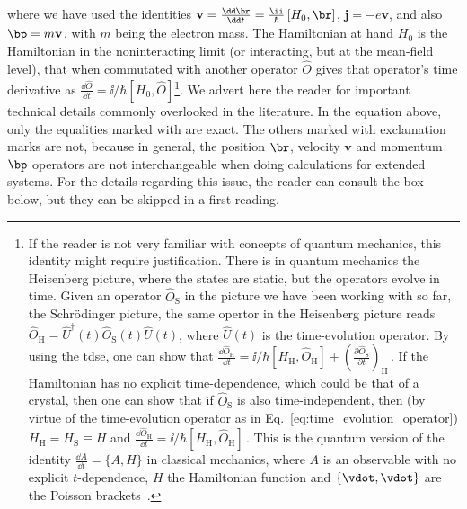 \noindent  where we have used the identities $\mathbf{v} = \frac{\dd \br}{\dd t} = \frac{\ii}{\hbar} \left[H_0,\br\right]$, $\mathbf{j}=-e\mathbf{v}$, and also $\bp = m \mathbf{v}$, with $m$ being the electron mass.
The Hamiltonian at hand $H_0$ is the Hamiltonian in the noninteracting limit (or interacting, but at the mean-field level), that when commutated with another operator $\hat{O}$ gives that operator's time derivative as $\frac{\dd \hat{O}}{\dd t} = \ii/\hbar [H_0,\hat{O}]$\footnote{If the reader is not very familiar with concepts of quantum mechanics, this identity might require justification. There is in quantum mechanics the Heisenberg picture, where the states are static, but the operators evolve in time. Given an operator $\hat{O}_\mathrm{S}$ in the picture we have been working with so far, the Schr\"{o}dinger picture, the same opertor in the Heisenberg picture reads $\hat{O}_{\mathrm{H}} = \hat{U}^{\dagger} (t) \hat{O}_{\mathrm{S}}(t) \hat{U}(t)$, where $\hat{U}(t)$ is the time-evolution operator. By using the \gls{tdse}, one can show that $\frac{\dd \hat{O}_{\mathrm{H}}}{\dd t} = \ii/\hbar [H_{\mathrm{H}},\hat{O}_{\mathrm{H}}] + \left(\frac{\partial \hat{O}_{\mathrm{S}}}{\partial t}\right)_{\mathrm{H}}$\,. If the Hamiltonian has no explicit time-dependence, which could be that of a crystal, then one can show that if $\hat{O}_{\mathrm{S}}$ is also time-independent, then (by virtue of the time-evolution operator as in Eq.~\eqref{eq:time_evolution_operator}) $H_{\mathrm{H}} = H_{\mathrm{S}} \equiv H$ and $\frac{\dd \hat{O}_{\mathrm{H}}}{\dd t} = \ii/\hbar [H_{\mathrm{H}},\hat{O}_{\mathrm{H}}]$\,. This is the quantum version of the identity $\frac{\dd A}{\dd t} = \{A,H\}$ in classical mechanics, where $A$ is an observable with no explicit $t$-dependence, $H$ the Hamiltonian function and $\{\vdot,\vdot\}$ are the Poisson brackets~\cite{goldstein:mechanics,Landau1976Mechanics}.}.
We advert here the reader for important technical details commonly overlooked in the literature.
In the equation above, only the equalities marked with \textcolor{black}{\checkmark} are exact.
The others marked with exclamation marks are not, because in general, the position $\br$, velocity $\mathbf{v}$ and momentum $\bp$ operators are not interchangeable when doing calculations for extended systems.
For the details regarding this issue, the reader can consult the box below, but they can be skipped in a first reading.

